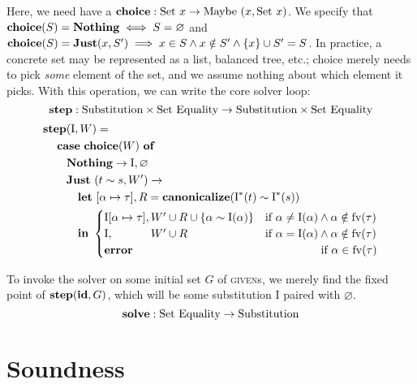 \documentclass[10pt, letterpaper, oneside]{article}
\newcommand{\inertset}{\text{I}}
\newcommand{\fv}{\mathrm{fv}}
\begin{document}
Here, we need have a \(\text{\bf choice} : \text{Set}~x \to \text{Maybe}~(x, \text{Set}~x)\). We specify that \(\text{\bf choice}(S) = \text{\bf Nothing} \iff S = \varnothing\) and \(\text{\bf choice}(S) = \text{\bf Just}(x, S^\prime) \implies x \in S \land x \notin S^\prime \land \{x\} \cup S^\prime = S\). In practice, a concrete set may be represented as a list, balanced tree, etc.; choice merely needs to pick \emph{some} element of the set, and we assume nothing about which element it picks. With this operation, we can write the core solver loop:
\begin{equation*}
  \text{\bf step} : \text{Substitution} \times \text{Set}~\text{Equality} \to \text{Substitution} \times \text{Set}~\text{Equality}
\end{equation*}
\begin{align*}
  \text{\bf step}&(\inertset, W) =\\
      &\!\!\!\!\!\text{\bf case}~\text{\bf choice}(W)~\text{\bf of}\\
      &\text{\bf Nothing} \to \inertset, \varnothing\\
      &\text{\bf Just}~(t \sim s, W^\prime) \to\\
      &~~~\text{\bf let}~[\alpha \mapsto \tau], R
      = \text{\bf canonicalize}(\inertset^\ast(t) \sim \inertset^\ast(s))\\
      &~~~\text{\bf in}~
        \begin{cases}
          \inertset[\alpha \mapsto \tau], W^\prime \cup R \cup \{\alpha \sim \inertset(\alpha)\} & \text{if }\alpha \ne \inertset(\alpha) \land \alpha \notin \fv(\tau)\\
          \inertset,\phantom{[\alpha \mapsto \tau]} W^\prime \cup R & \text{if }\alpha = \inertset(\alpha)\land\alpha \notin \fv(\tau)\\
          \text{\bf error} & \phantom{\alpha = \inertset(\alpha)\land\ \,}\text{if }\alpha \in \fv(\tau)
        \end{cases}
\end{align*}

To invoke the solver on some initial set \(G\) of \textsc{given}s, we merely find the fixed point of \(\text{\bf step}(\text{\bf id}, G)\), which will be some substitution \(\inertset\) paired with \(\varnothing\).
\begin{equation*}
  \text{\bf solve} : \text{Set}~\text{Equality} \to \text{Substitution}
\end{equation*}

\section{Soundness}
\end{document}
